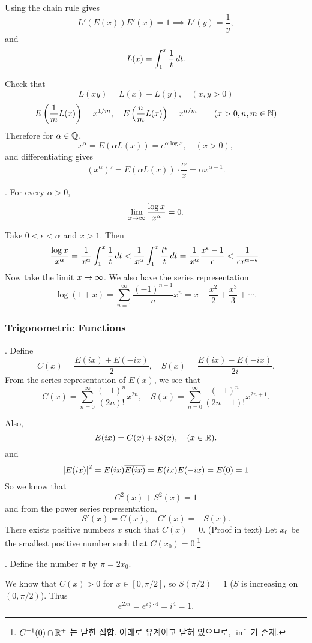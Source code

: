Using the chain rule gives
\[
    L'(E(x)) E'(x) = 1 \implies L'(y) = \frac{1}{y},
\]
and
\[
    L(x) = \int_1^x \frac{1}{t}\,d{t}.
\]

Check that
\[
    L(xy) = L(x) + L(y), \quad (x, y > 0)
\]
\[
    E\left(\frac{1}{m}L(x)\right) = x^{1/m}, \quad E\left(\frac{n}{m}L(x)\right) = x^{n/m} \qquad (x > 0, n, m \in \mathbb{N})
\]
Therefore for \(\alpha \in \mathbb{Q}\),
\[
    x^\alpha = E(\alpha L(x)) = e^{\alpha \log x}, \quad (x > 0),
\]
and differentiating gives
\[
    (x^\alpha)' = E(\alpha L(x))\cdot \frac{\alpha}{x} = \alpha x^{\alpha - 1}.
\]

\thm. For every \(\alpha > 0\),
\[
    \lim_{x \rightarrow\infty} \frac{\log x}{x^\alpha} = 0.
\]

\pf Take \(0 < \epsilon < \alpha\) and \(x > 1\). Then
\[
    \frac{\log x}{x^\alpha} = \frac{1}{x^\alpha} \int_1^x \frac{1}{t}\,d{t} < \frac{1}{x^\alpha} \int_1^x \frac{t^\epsilon}{t} \,d{t} = \frac{1}{x^\alpha} \frac{x^\epsilon - 1}{\epsilon} < \frac{1}{\epsilon x^{\alpha - \epsilon}}.
\]
Now take the limit \(x \rightarrow \infty\).
We also have the series representation
\[
    \log(1+x) = \sum_{n=1}^\infty \frac{(-1)^{n-1}}{n}x^n = x - \frac{x^2}{2} + \frac{x^3}{3} + \cdots.
\]

\medskip

\subsubsection*{Trigonometric Functions}

. Define
\[
    C(x) = \frac{E(ix) + E(-ix)}{2}, \quad S(x) = \frac{E(ix) - E(-ix)}{2i}.
\]
From the series representation of \(E(x)\), we see that
\[
    C(x) = \sum_{n=0}^\infty \frac{(-1)^n}{(2n)!}x^{2n}, \quad S(x) = \sum_{n=0}^\infty \frac{(-1)^n}{(2n+1)!} x^{2n+1}.
\]

Also,
\[
    E(ix) = C(x) + iS(x), \quad (x\in \mathbb{R}).
\]
and
\[
    \left| E(ix) \right|^2 = E(ix)\overline{E(ix)} = E(ix) E(-ix) = E(0) = 1
\]
So we know that
\[
    C^2(x) + S^2(x) = 1
\]
and from the power series representation,
\[
    S'(x) = C(x), \quad C'(x) = -S(x).
\]
There exists positive numbers \(x\) such that \(C(x) = 0\). (Proof in text) Let \(x_0\) be the smallest positive number such that \(C(x_0) = 0\).\footnote{\(C^{-1}(0) \cap \mathbb{R}^+\) 는 닫힌 집합. 아래로 유계이고 닫혀 있으므로, \(\inf\) 가 존재.}

. Define the number \(\pi\) by \(\pi = 2x_0\).

We know that \(C(x) > 0\) for \(x \in [0, \pi/2]\), so \(S(\pi/2) = 1\) (\(S\) is increasing on \((0, \pi/2)\)). Thus
\[
    e^{2\pi i} = e^{i\frac{\pi}{2} \cdot 4} = i^4 = 1.
\]

